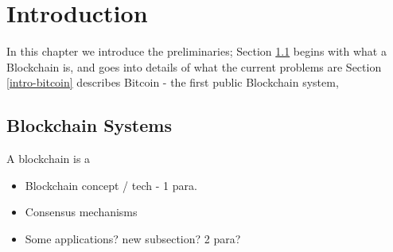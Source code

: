 \chapter{Introduction} \label{ch-intro}






In this chapter we introduce the preliminaries; 
Section \ref{intro-blockchain} begins with what a Blockchain is, and goes into details of what the current problems are
Section \ref{intro-bitcoin} describes Bitcoin - the first public Blockchain system,


\section{Blockchain Systems} \label{intro-blockchain}

A blockchain is a 

\begin{itemize}
    \item Blockchain concept / tech - 1 para.
    \item Consensus mechanisms
    \item Some applications? new subsection? 2 para?
\end{itemize}

\newpage 
